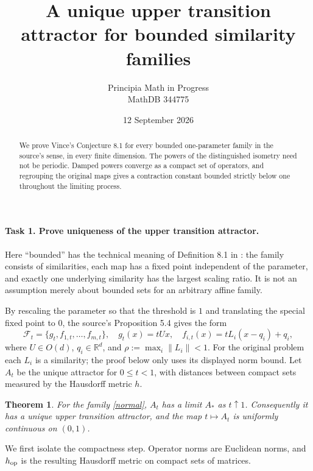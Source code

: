 \documentclass[11pt]{article}
\title{A unique upper transition attractor for bounded similarity families}
\author{Principia Math in Progress\\MathDB 344775}
\date{12 September 2026}
\newtheorem{theorem}{Theorem}
\begin{document}
\maketitle
\begin{abstract}
We prove Vince's Conjecture 8.1 for every bounded one-parameter family in
the source's sense, in every finite dimension. The powers of the distinguished
isometry need not be periodic. Damped powers converge as a compact set of
operators, and regrouping the original maps gives a contraction constant
bounded strictly below one throughout the limiting process.
\end{abstract}

\paragraph{Task 1. Prove uniqueness of the upper transition attractor.}
Here ``bounded'' has the technical meaning of Definition 8.1 in \cite{V}:
the family consists of similarities, each map has a fixed point independent
of the parameter, and exactly one underlying similarity has the largest
scaling ratio. It is not an assumption merely about bounded sets for an
arbitrary affine family.

By rescaling the parameter so that the threshold is $1$ and translating
the special fixed point to $0$, the source's Proposition 5.4 gives the form
\begin{equation}\label{normal}
 \mathcal F_t=\{g_t,f_{1,t},\ldots,f_{m,t}\},\quad
 g_t(x)=tUx,\quad f_{i,t}(x)=tL_i(x-q_i)+q_i,
\end{equation}
where $U\in O(d)$, $q_i\in\mathbb R^d$, and
$\rho:=\max_i\|L_i\|<1$. For the original problem each $L_i$ is a similarity;
the proof below only uses its displayed norm bound. Let $A_t$ be the unique
attractor for $0\le t<1$, with distances between compact sets measured by
the Hausdorff metric $h$.

\begin{theorem}\label{main}
For the family \eqref{normal}, $A_t$ has a limit $A_*$ as $t\uparrow1$.
Consequently it has a unique upper transition attractor, and the map
$t\mapsto A_t$ is uniformly continuous on $(0,1)$.
\end{theorem}

We first isolate the compactness step. Operator norms are Euclidean norms,
and $h_{\rm op}$ is the resulting Hausdorff metric on compact sets of matrices.
\end{document}
